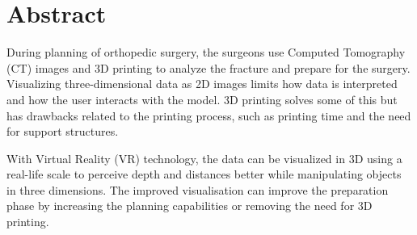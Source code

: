 \documentclass[a4paper]{report}
\begin{document}
%
%


\makeatletter
{}
\def\lst@SkipToFirst{%
    \lst@ifmatchrangestart\c@lstnumber=\numexpr-1+\lst@firstline\fi
    \ifnum \lst@lineno<\lst@firstline
        \def\lst@next{\lst@BeginDropInput\lst@Pmode
        \lst@Let{13}\lst@MSkipToFirst
        \lst@Let{10}\lst@MSkipToFirst}%
        \expandafter\lst@next
    \else
        \expandafter\lst@BOLGobble
    \fi}
\makeatother



\titlePage
\pagebreak

\section*{Abstract}
During planning of orthopedic surgery, the surgeons use Computed Tomography (CT) images and 3D printing to analyze the fracture and prepare for the surgery.
Visualizing three-dimensional data as 2D images limits how data is interpreted and how the user interacts with the model. 3D printing solves some of this but has drawbacks related to the printing process, such as printing time and the need for support structures.

With Virtual Reality (VR) technology, the data can be visualized in 3D using a real-life scale to perceive depth and distances better while manipulating objects in three dimensions. The improved visualisation can improve the preparation phase by increasing the planning capabilities or removing the need for 3D printing.
\end{document}

